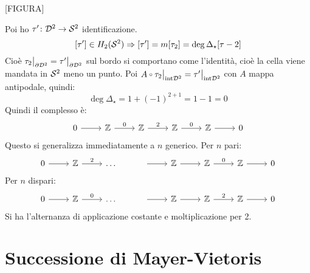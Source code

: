 [FIGURA]

Poi ho $ \tau' \colon \mathcal{D}^{2} \to \mathcal{S}^{2} $ identificazione.
\[
  [\tau'] \in H_2(\mathcal{S}^{2}) \Rightarrow [\tau'] = m[\tau_2] = \deg{\Delta_\star}[\tau-2]
\]
Cioè
$ \tau_2 \big \lvert_{\partial \mathcal{D}^{2}} = \tau' \big \lvert_{\partial \mathcal{D}^{2}} $ sul bordo si
comportano come l'identità, cioè la cella viene mandata in $ \mathcal{S}^{2} $ meno un
punto. Poi $ A \circ \tau_2 \big \lvert_{\mathrm{int} \Disk{2}} = \tau' \big \lvert_{\mathrm{int} \Disk{2}} $
con $ A $ mappa antipodale, quindi:
\[
  \deg{\Delta_\star} = 1 + (-1)^{2 + 1} = 1 - 1 = 0
\]
Quindi il complesso è:
\[
  \begin{tikzcd}
    0 \rar & \Z \rar{0} & \Z \rar{2} & \Z \rar{0}  & \Z \rar & 0
  \end{tikzcd}
\]
Questo si generalizza immediatamente a $ n $ generico.
Per $ n $ pari:
\[
  \begin{tikzcd}
    0 \rar & \Z \rar{2} & \dots & \rar & \Z \rar & \Z \rar{0} & \Z \rar & 0
  \end{tikzcd}
\]
Per $ n $ dispari:
\[
  \begin{tikzcd}
    0 \rar & \Z \rar{0} & \dots & \rar & \Z \rar & \Z \rar{2} & \Z \rar & 0
  \end{tikzcd}
\]
Si ha l'alternanza di applicazione costante e moltiplicazione per 2.

\section{Successione di Mayer-Vietoris}

